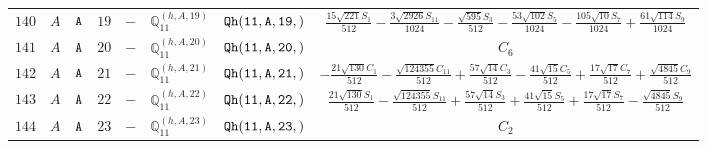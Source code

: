 \documentclass[fleqn,8pt]{jsarticle}
\begin{document}
\begin{table}[ht!]
\begin{center}
\begin{tabular}{cccccccc}
$ 140 $ & $ A $ & $ {\tt A} $ & $ 19 $ & $ - $ & $ \mathbb{Q}_{11}^{(h,A,19)} $ & $ {\tt Qh(11,A,19,)} $ & $ \frac{15 \sqrt{221} S_{1}}{512} - \frac{3 \sqrt{2926} S_{11}}{1024} - \frac{\sqrt{595} S_{3}}{512} - \frac{53 \sqrt{102} S_{5}}{1024} - \frac{105 \sqrt{10} S_{7}}{1024} + \frac{61 \sqrt{114} S_{9}}{1024} $ \\
$ 141 $ & $ A $ & $ {\tt A} $ & $ 20 $ & $ - $ & $ \mathbb{Q}_{11}^{(h,A,20)} $ & $ {\tt Qh(11,A,20,)} $ & $ C_{6} $ \\
$ 142 $ & $ A $ & $ {\tt A} $ & $ 21 $ & $ - $ & $ \mathbb{Q}_{11}^{(h,A,21)} $ & $ {\tt Qh(11,A,21,)} $ & $ - \frac{21 \sqrt{130} C_{1}}{512} - \frac{\sqrt{124355} C_{11}}{512} + \frac{57 \sqrt{14} C_{3}}{512} - \frac{41 \sqrt{15} C_{5}}{512} + \frac{17 \sqrt{17} C_{7}}{512} + \frac{\sqrt{4845} C_{9}}{512} $ \\
$ 143 $ & $ A $ & $ {\tt A} $ & $ 22 $ & $ - $ & $ \mathbb{Q}_{11}^{(h,A,22)} $ & $ {\tt Qh(11,A,22,)} $ & $ \frac{21 \sqrt{130} S_{1}}{512} - \frac{\sqrt{124355} S_{11}}{512} + \frac{57 \sqrt{14} S_{3}}{512} + \frac{41 \sqrt{15} S_{5}}{512} + \frac{17 \sqrt{17} S_{7}}{512} - \frac{\sqrt{4845} S_{9}}{512} $ \\
$ 144 $ & $ A $ & $ {\tt A} $ & $ 23 $ & $ - $ & $ \mathbb{Q}_{11}^{(h,A,23)} $ & $ {\tt Qh(11,A,23,)} $ & $ C_{2} $ \\
 \hline \hline
\end{tabular}
\end{center}
\end{table}
\end{document}
